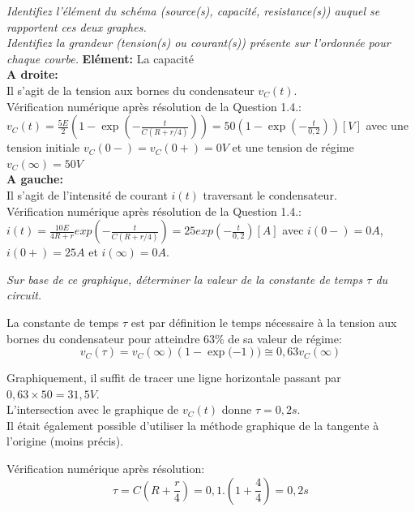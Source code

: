 \Question
{
\textit{Identifiez l'élément du schéma (source(s), capacité, resistance(s)) auquel se rapportent ces deux graphes.\\
Identifiez la grandeur (tension(s) ou courant(s)) présente sur l'ordonnée pour chaque courbe.}
}
{
\textbf{Elément:} La capacité\\

\textbf{A droite:}\\
Il s'agit de la tension aux bornes du condensateur $v_C(t)$.\\

Vérification numérique après résolution de la Question 1.4.:\\
$v_C(t)=\frac{5E}{2}(1-\exp{(-\frac{t}{C(R+r/4)})})=50(1-\exp{(-\frac{t}{0,2})}) [V]$ avec une tension initiale $v_C(0-)=v_C(0+)=0V$ et une tension de régime $v_C(\infty)=50V$\\


\textbf{A gauche:}\\
Il s'agit de l'intensité de courant $i(t)$ traversant le condensateur.\\

Vérification numérique après résolution de la Question 1.4.:\\
$i(t)=\frac{10E}{4R+r}exp{(-\frac{t}{C(R+r/4)})}=25 exp{(-\frac{t}{0,2})} [A]$ avec $i(0-)=0A$, $i(0+)=25A$ et $i(\infty)=0A$.
}


\Question
{
\textit{Sur base de ce graphique, déterminer la valeur de la constante de temps $\tau$ du circuit.}
}
{
La constante de temps $\tau$ est par définition le temps nécessaire à la tension aux bornes du condensateur pour atteindre $63\%$ de sa valeur de régime:
$$v_C(\tau)=v_C(\infty)(1-\exp{(-1}))\cong 0,63v_C(\infty)$$

Graphiquement, il suffit de tracer une ligne horizontale passant par $0,63\times 50=31,5V$.\\ L'intersection avec le graphique de $v_C(t)$ donne $\tau=0,2s$.\\

Il était également possible d'utiliser la méthode graphique de la tangente à l'origine (moins précis).

Vérification numérique après résolution:
$$\tau=C(R+\frac{r}{4})=0,1.(1+\frac{4}{4})=0,2s$$
}


